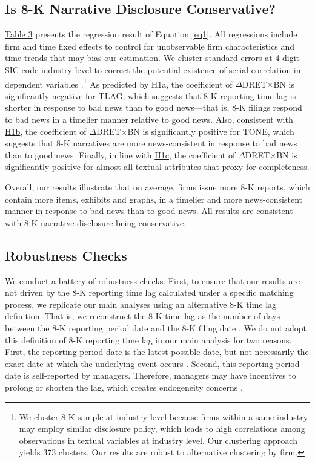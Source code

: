 \documentclass[letterpaper,12pt]{article}
\begin{document}
\begin{spacing}{1.5}
\subsection{Is 8-K Narrative Disclosure Conservative?}
\noindent \hyperref[T3]{Table 3} presents the regression result of Equation \eqref{eq1}. All regressions include firm and time fixed effects to control for unobservable firm characteristics and time trends that may bias our estimation. We cluster standard errors at 4-digit SIC code industry level to correct the potential existence of serial correlation in dependent variables \cite{petersenEstimatingStandardErrors2009}.\footnote{We cluster 8-K sample at industry level because firms within a same industry may employ similar disclosure policy, which leads to high correlations among observations in textual variables at industry level. Our clustering approach yields 373 clusters. Our results are robust to alternative clustering by firm. } As predicted by \hyperref[hyp:h1a]{H1a}, the coefficient of $\Delta$DRET$\times$BN is significantly negative for TLAG,
which suggests that 8-K reporting time lag is shorter in response to bad news than to good news---that is, 8-K filings respond to bad news in a timelier manner relative to good news. Also, consistent with \hyperref[hyp:h1b]{H1b}, the coefficient of $\Delta$DRET$\times$BN is significantly positive for TONE, which suggests that 8-K narratives are more news-consistent in response to bad news than to good news. Finally, in line with \hyperref[hyp:h1c]{H1c}, the coefficient of $\Delta$DRET$\times$BN is significantly positive for almost all textual attributes that proxy for completeness.

Overall, our results illustrate that on average, firms issue more 8-K reports, which contain more items, exhibits and graphs, in a timelier and more news-consistent manner in response to bad news than to good news. All results are consistent with 8-K narrative disclosure being conservative.

\subsection{Robustness Checks}
\noindent We conduct a battery of robustness checks. 
First, to ensure that our results are not driven by the 8-K reporting time lag calculated under a specific matching process, we replicate our main analyses using an alternative 8-K time lag definition. That is, we reconstruct the 8-K time lag as the number of days between the 8-K reporting period date and the 8-K filing date \cite{carterRelevanceForm8K1999, niessnerStrategicDisclosureTiming2015, chapmanInformationOverloadDisclosure2019}. We do not adopt this definition of 8-K reporting time lag in our main analysis for two reasons. First, the reporting period date is the latest possible date, but not necessarily the exact date at which the underlying event occurs \cite{secFinalRuleAdditional2004}. Second, this reporting period date is self-reported by managers. Therefore, managers may have incentives to prolong or shorten the lag, which creates endogeneity concerns \cite{chapmanInformationOverloadDisclosure2019}.


\end{spacing}
\end{document}
